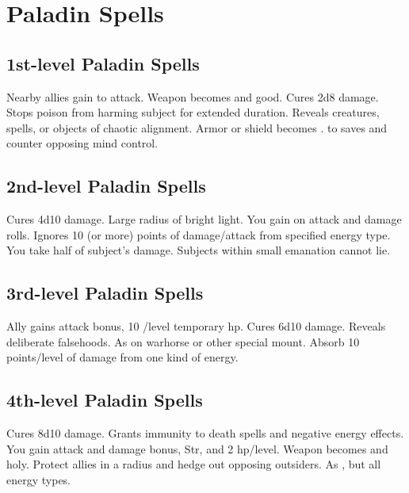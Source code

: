 \section{Paladin Spells}  

\subsection{1st-level Paladin Spells}
\begin{spelllist}
 Nearby allies gain  to attack.
 Weapon becomes  and good.
 Cures 2d8 damage.
 Stops poison from harming subject for extended duration.
 Reveals creatures, spells, or objects of chaotic alignment.
 Armor or shield becomes .
  to saves and counter opposing mind control.
\end{spelllist}

\subsection{2nd-level Paladin Spells}
\begin{spelllist}
 Cures 4d10 damage.
 Large radius of bright light.
 You gain  on attack and damage rolls.
 Ignores 10 (or more) points of damage/attack from specified energy type.
\F You take half of subject's damage.
 Subjects within small emanation cannot lie.
\end{spelllist}

\subsection{3rd-level Paladin Spells}
\begin{spelllist} 
 Ally gains  attack bonus, 10 /level temporary hp.
 Cures 6d10 damage.
 Reveals deliberate falsehoods.
 As  on warhorse or other special mount.
 Absorb 10 points/level of damage from one kind of energy.
\end{spelllist}

\subsection{4th-level Paladin Spells}
\begin{spelllist}
 Cures 8d10 damage.
 Grants immunity to death spells and negative energy effects.
 You gain attack and damage bonus,  Str, and 2 hp/level.
 Weapon becomes  and holy.
 Protect allies in a \areamed radius and hedge out opposing outsiders.
 As , but all energy types. 
\end{spelllist}

